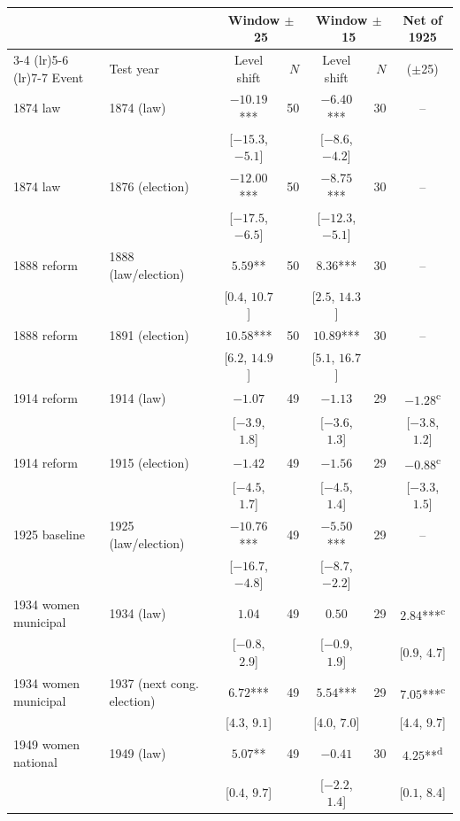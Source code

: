 \begin{tabular}{llcrcrc}
\toprule
 & & \multicolumn{2}{c}{Window $\pm$25} & \multicolumn{2}{c}{Window $\pm$15} & Net of 1925 \\
\cmidrule(lr){3-4} \cmidrule(lr){5-6} \cmidrule(lr){7-7}
Event & Test year & Level shift & $N$ & Level shift & $N$ & ($\pm$25) \\
\midrule
1874 law & 1874 (law) & $-10.19$*** & 50 & $-6.40$*** & 30 & -- \\
 & & [$-15.3$, $-5.1$] & & [$-8.6$, $-4.2$] & &  \\
1874 law & 1876 (election) & $-12.00$*** & 50 & $-8.75$*** & 30 & -- \\
 & & [$-17.5$, $-6.5$] & & [$-12.3$, $-5.1$] & &  \\
1888 reform & 1888 (law/election) & $5.59$** & 50 & $8.36$*** & 30 & -- \\
 & & [$0.4$, $10.7$] & & [$2.5$, $14.3$] & &  \\
1888 reform & 1891 (election) & $10.58$*** & 50 & $10.89$*** & 30 & -- \\
 & & [$6.2$, $14.9$] & & [$5.1$, $16.7$] & &  \\
1914 reform & 1914 (law) & $-1.07$ & 49 & $-1.13$ & 29 & $-1.28$\textsuperscript{c} \\
 & & [$-3.9$, $1.8$] & & [$-3.6$, $1.3$] & & [$-3.8$, $1.2$] \\
1914 reform & 1915 (election) & $-1.42$ & 49 & $-1.56$ & 29 & $-0.88$\textsuperscript{c} \\
 & & [$-4.5$, $1.7$] & & [$-4.5$, $1.4$] & & [$-3.3$, $1.5$] \\
1925 baseline & 1925 (law/election) & $-10.76$*** & 49 & $-5.50$*** & 29 & -- \\
 & & [$-16.7$, $-4.8$] & & [$-8.7$, $-2.2$] & &  \\
1934 women municipal & 1934 (law) & $1.04$ & 49 & $0.50$ & 29 & $2.84$***\textsuperscript{c} \\
 & & [$-0.8$, $2.9$] & & [$-0.9$, $1.9$] & & [$0.9$, $4.7$] \\
1934 women municipal & 1937 (next cong. election) & $6.72$*** & 49 & $5.54$*** & 29 & $7.05$***\textsuperscript{c} \\
 & & [$4.3$, $9.1$] & & [$4.0$, $7.0$] & & [$4.4$, $9.7$] \\
1949 women national & 1949 (law) & $5.07$** & 49 & $-0.41$ & 30 & $4.25$**\textsuperscript{d} \\
 & & [$0.4$, $9.7$] & & [$-2.2$, $1.4$] & & [$0.1$, $8.4$] \\

\end{tabular}
